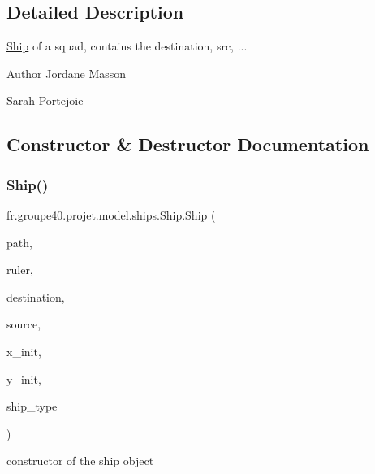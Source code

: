 \subsection{Detailed Description}
\hyperlink{classfr_1_1groupe40_1_1projet_1_1model_1_1ships_1_1_ship}{Ship} of a squad, contains the destination, src, ... 

\begin{DoxyAuthor}{Author}
Jordane Masson 

Sarah Portejoie 
\end{DoxyAuthor}


\subsection{Constructor \& Destructor Documentation}
\mbox{\label{classfr_1_1groupe40_1_1projet_1_1model_1_1ships_1_1_ship_a50b240c8ac54e3944b63208c5df4cb91}} 
\subsubsection{\texorpdfstring{Ship()}{Ship()}}
{\footnotesize\ttfamily fr.\+groupe40.\+projet.\+model.\+ships.\+Ship.\+Ship (\begin{DoxyParamCaption}\item[{String}]{path,  }\item[{\hyperlink{classfr_1_1groupe40_1_1projet_1_1client_1_1_user}{User}}]{ruler,  }\item[{\hyperlink{classfr_1_1groupe40_1_1projet_1_1model_1_1planets_1_1_planet}{Planet}}]{destination,  }\item[{\hyperlink{classfr_1_1groupe40_1_1projet_1_1model_1_1planets_1_1_planet}{Planet}}]{source,  }\item[{double}]{x\+\_\+init,  }\item[{double}]{y\+\_\+init,  }\item[{\hyperlink{classfr_1_1groupe40_1_1projet_1_1model_1_1ships_1_1_ship_type}{Ship\+Type}}]{ship\+\_\+type }\end{DoxyParamCaption})}



constructor of the ship object 


